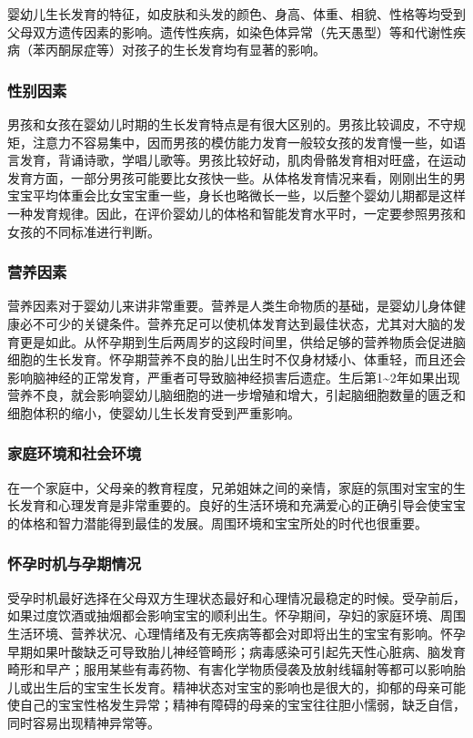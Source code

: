 婴幼儿生长发育的特征，如皮肤和头发的颜色、身高、体重、相貌、性格等均受到父母双方遗传因素的影响。遗传性疾病，如染色体异常（先天愚型）等和代谢性疾病（苯丙酮尿症等）对孩子的生长发育均有显著的影响。


\subsubsection{性别因素}%

男孩和女孩在婴幼儿时期的生长发育特点是有很大区别的。男孩比较调皮，不守规矩，注意力不容易集中，因而男孩的模仿能力发育一般较女孩的发育慢一些，如语言发育，背诵诗歌，学唱儿歌等。男孩比较好动，肌肉骨骼发育相对旺盛，在运动发育方面，一部分男孩可能要比女孩快一些。从体格发育情况来看，刚刚出生的男宝宝平均体重会比女宝宝重一些，身长也略微长一些，以后整个婴幼儿期都是这样一种发育规律。因此，在评价婴幼儿的体格和智能发育水平时，一定要参照男孩和女孩的不同标准进行判断。


\subsubsection{营养因素}%

营养因素对于婴幼儿来讲非常重要。营养是人类生命物质的基础，是婴幼儿身体健康必不可少的关键条件。营养充足可以使机体发育达到最佳状态，尤其对大脑的发育更是如此。从怀孕期到生后两周岁的这段时间里，供给足够的营养物质会促进脑细胞的生长发育。怀孕期营养不良的胎儿出生时不仅身材矮小、体重轻，而且还会影响脑神经的正常发育，严重者可导致脑神经损害后遗症。生后第1\textasciitilde2年如果出现营养不良，就会影响婴幼儿脑细胞的进一步增殖和增大，引起脑细胞数量的匮乏和细胞体积的缩小，使婴幼儿生长发育受到严重影响。


\subsubsection{家庭环境和社会环境}%

在一个家庭中，父母亲的教育程度，兄弟姐妹之间的亲情，家庭的氛围对宝宝的生长发育和心理发育是非常重要的。良好的生活环境和充满爱心的正确引导会使宝宝的体格和智力潜能得到最佳的发展。周围环境和宝宝所处的时代也很重要。


\subsubsection{怀孕时机与孕期情况}%

受孕时机最好选择在父母双方生理状态最好和心理情况最稳定的时候。受孕前后，如果过度饮酒或抽烟都会影响宝宝的顺利出生。怀孕期间，孕妇的家庭环境、周围生活环境、营养状况、心理情绪及有无疾病等都会对即将出生的宝宝有影响。怀孕早期如果叶酸缺乏可导致胎儿神经管畸形；病毒感染可引起先天性心脏病、脑发育畸形和早产；服用某些有毒药物、有害化学物质侵袭及放射线辐射等都可以影响胎儿或出生后的宝宝生长发育。精神状态对宝宝的影响也是很大的，抑郁的母亲可能使自己的宝宝性格发生异常；精神有障碍的母亲的宝宝往往胆小懦弱，缺乏自信，同时容易出现精神异常等。


